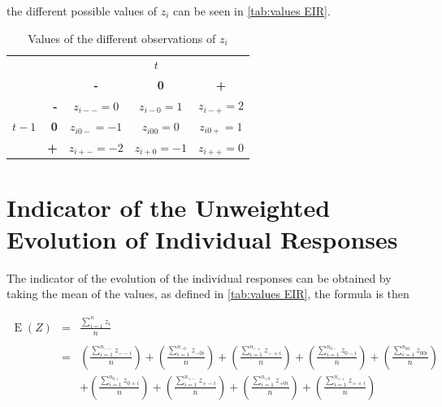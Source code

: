\documentclass[12pt,a4paper,oneside]{book}
\DeclareMathOperator{\E}{E}
\begin{document}
the different possible values of $z_i$ can be seen in \autoref{tab:values EIR}. 

\begin{table}[H]
     \centering \footnotesize
    \begin{tabular}{r | r | c c c | }
    \multicolumn{1}{r}{} & \multicolumn{1}{r}{} &    \multicolumn{3}{c}{$t$} \\ \cline{3-5}
    \multicolumn{1}{r}{} &         & \textbf{-} & \textbf{0} & \textbf{+} \\ \cline{2-5}
           &    \textbf{-} & $z_{i--}=0$    & $z_{i-0}=1$    & $z_{i-+}=2$ \\ 
    $t-1$ & \textbf{0}  & $z_{i0-}=-1$    & $z_{i00}=0$    & $z_{i0+}=1$    \\
            & \textbf{+}& $z_{i+-}=-2$    & $z_{i+0}=-1$    & $z_{i++}=0$ \\ \cline{2-5}
\end{tabular}
    \caption{Values of the different observations of $z_i$}
    \label{tab:values EIR}
\end{table}{}

\section{Indicator of the Unweighted Evolution of Individual Responses}


The indicator of the evolution of the individual responses can be obtained by taking the mean of the values, as defined in \autoref{tab:values EIR}, the formula is then

\begin{eqnarray}
    \E(Z) &=&  \frac{ \sum_{i=1}^n z_i}{n} \\ \nonumber \\
        &=& \left( \frac{ \sum_{i=1}^{n_{--}} z_{--i}}{n} \right)
     + \left( \frac{\sum_{i=1}^{n_{-0}} z_{-0i} }{n} \right)
    + \left( \frac{\sum_{i=1}^{n_{-+}} z_{-+i}}{n} \right)
    + \left( \frac{\sum_{i=1}^{n_{0-}} z_{0-i} }{n} \right)
    + \left( \frac{\sum_{i=1}^{n_{00}} z_{00i} }{n} \right) \nonumber  \\
    &&  + \left( \frac{\sum_{i=1}^{n_{0+}} z_{0+i}}{n} \right)
    + \left( \frac{\sum_{i=1}^{n_{+-}} z_{+-i} }{n} \right)
    + \left( \frac{\sum_{i=1}^{n_{+0}} z_{+0i} }{n} \right)
    + \left( \frac{\sum_{i=1}^{n_{++}} z_{++i}}{n} \right)
\end{eqnarray}
\end{document}
